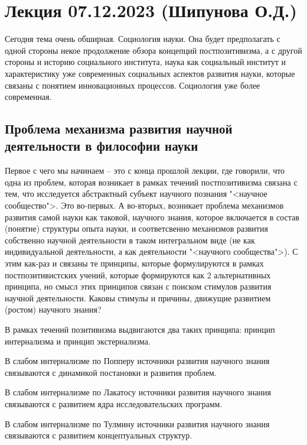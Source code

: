 \documentclass[main.tex]{subfiles}
\begin{document}
\section{Лекция 07.12.2023 (Шипунова О.Д.)}


Сегодня тема очень обширная.
Социология науки.
Она будет предполагать с одной стороны некое продолжение обзора концепций постпозитивизма, а с другой стороны и историю социального института, наука как социальный институт и характеристику уже современных социальных аспектов развития науки, которые связаны с понятием инновационных процессов.
Социология уже более современная.

\subsection{Проблема механизма развития научной деятельности в философии науки}


Первое с чего мы начинаем -- это с конца прошлой лекции, где говорили, что одна из проблем, которая возникает в рамках течений постпозитивизма связана с тем, что исследуется абстрактный субъект научного познания "<научное сообщество">.
Это во-первых.
А во-вторых, возникает проблема механизмов развития самой науки как таковой, научного знания, которое включается в состав (понятие) структуры опыта науки, и соответсвенно механизмов развития собственно научной деятельности в таком интегральном виде (не как индивидуальной деятельности, а как деятельности "<научного сообщества">).
С этим как-раз и связаны те принципы, которые формулируются в рамках постпозитивистских учений, которые формируются как 2 альтернативных принципа, но смысл этих принципов связан с поиском стимулов развития научной деятельности.
Каковы стимулы и причины, движущие развитием (ростом) научного знания?

В рамках течений позитивизма выдвигаются два таких принципа: принцип интернализма и принцип экстернализма.

В слабом интернализме по Попперу источники развития научного знания связываются с динамикой постановки и развития проблем.

В слабом интернализме по Лакатосу источники развития научного знания связываются с развитием ядра исследовательских программ.

В слабом интернализме по Тулмину источники развития научного знания связываются с развитием концептуальных структур.
\end{document}

